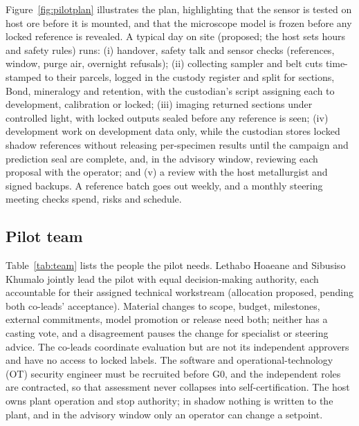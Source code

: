 \documentclass[10pt,a4paper,twocolumn]{article}
\begin{document}
Figure~\ref{fig:pilotplan} illustrates the plan, highlighting that the sensor is tested on host ore before it is mounted, and that the microscope model is frozen before any locked reference is revealed. A typical day on site (proposed; the host sets hours and safety rules) runs: (i) handover, safety talk and sensor checks (references, window, purge air, overnight refusals); (ii) collecting sampler and belt cuts time-stamped to their parcels, logged in the custody register and split for sections, Bond, mineralogy and retention, with the custodian's script assigning each to development, calibration or locked; (iii) imaging returned sections under controlled light, with locked outputs sealed before any reference is seen; (iv) development work on development data only, while the custodian stores locked shadow references without releasing per-specimen results until the campaign and prediction seal are complete, and, in the advisory window, reviewing each proposal with the operator; and (v) a review with the host metallurgist and signed backups. A reference batch goes out weekly, and a monthly steering meeting checks spend, risks and schedule.

\subsection{Pilot team}

Table~\ref{tab:team} lists the people the pilot needs. Lethabo Hoaeane and Sibusiso Khumalo jointly lead the pilot with equal decision-making authority, each accountable for their assigned technical workstream (allocation proposed, pending both co-leads' acceptance). Material changes to scope, budget, milestones, external commitments, model promotion or release need both; neither has a casting vote, and a disagreement pauses the change for specialist or steering advice. The co-leads coordinate evaluation but are not its independent approvers and have no access to locked labels. The software and operational-technology (OT) security engineer must be recruited before G0, and the independent roles are contracted, so that assessment never collapses into self-certification. The host owns plant operation and stop authority; in shadow nothing is written to the plant, and in the advisory window only an operator can change a setpoint.
\end{document}
